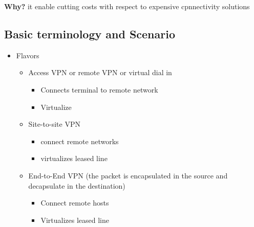 \documentclass{article}
\begin{document}
\textbf{Why?} it enable cutting costs with respect to expensive cpnnectivity solutions

\subsection{Basic terminology and Scenario}

\begin{itemize}
    \item Flavors
    \begin{itemize}
        \item Access VPN or remote VPN or virtual dial in
        \begin{itemize}
            \item Connects terminal to remote network
            \item Virtualize
        \end{itemize}
        \item Site-to-site VPN
        \begin{itemize}
            \item connect remote networks
            \item virtualizes leased line
        \end{itemize}
        \item End-to-End VPN (the packet is encapsulated in the source and decapsulate in the destination)
        \begin{itemize}
            \item Connect remote hosts
            \item Virtualizes leased line
        \end{itemize} 
        

\end{itemize}
\end{itemize}
\end{document}
